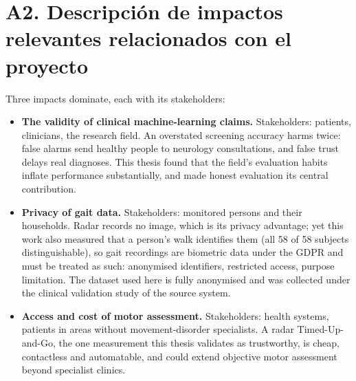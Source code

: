 \section*{A2. Descripci\'on de impactos relevantes relacionados con el proyecto}
\normalsize{Three impacts dominate, each with its stakeholders:

\begin{itemize}
  \item \textbf{The validity of clinical machine-learning claims.}
        Stakeholders: patients, clinicians, the research field. An
        overstated screening accuracy harms twice: false alarms send
        healthy people to neurology consultations, and false trust delays
        real diagnoses. This thesis found that the field's evaluation
        habits inflate performance substantially, and made honest
        evaluation its central contribution.
  \item \textbf{Privacy of gait data.} Stakeholders: monitored persons and
        their households. Radar records no image, which is its privacy
        advantage; yet this work also measured that a person's walk
        identifies them (all 58 of 58 subjects distinguishable), so gait
        recordings are biometric data under the GDPR and must be treated as
        such: anonymised identifiers, restricted access, purpose
        limitation. The dataset used here is fully anonymised and was
        collected under the clinical validation study of the source
        system.
  \item \textbf{Access and cost of motor assessment.} Stakeholders: health
        systems, patients in areas without movement-disorder specialists. A
        radar Timed-Up-and-Go, the one measurement this thesis validates as
        trustworthy, is cheap, contactless and automatable, and could
        extend objective motor assessment beyond specialist clinics.
\end{itemize}}
\vspace{0.1cm}

